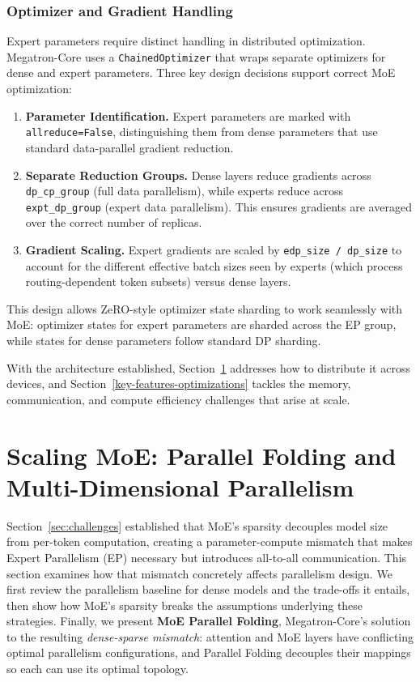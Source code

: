 \subsubsection{Optimizer and Gradient Handling}

Expert parameters require distinct handling in distributed optimization. Megatron-Core uses a \texttt{Chained\-Optimizer} that wraps separate optimizers for dense and expert parameters. Three key design decisions support correct MoE optimization:

\begin{enumerate}
    \item \textbf{Parameter Identification.} Expert parameters are marked with \texttt{allreduce=False}, distinguishing them from dense parameters that use standard data-parallel gradient reduction.

    \item \textbf{Separate Reduction Groups.} Dense layers reduce gradients across \texttt{dp\_cp\_group} (full data parallelism), while experts reduce across \texttt{expt\_dp\_group} (expert data parallelism). This ensures gradients are averaged over the correct number of replicas.

    \item \textbf{Gradient Scaling.} Expert gradients are scaled by \texttt{edp\_size / dp\_size} to account for the different effective batch sizes seen by experts (which process routing-dependent token subsets) versus dense layers.
\end{enumerate}

This design allows ZeRO-style optimizer state sharding \cite{rajbhandari2020zero} to work seamlessly with MoE: optimizer states for expert parameters are sharded across the EP group, while states for dense parameters follow standard DP sharding.

With the architecture established, Section~\ref{parallelism-strategies} addresses how to distribute it across devices, and Section~\ref{key-features-optimizations} tackles the memory, communication, and compute efficiency challenges that arise at scale.

\section{Scaling MoE: Parallel Folding and Multi-Dimensional Parallelism}\label{parallelism-strategies}

Section~\ref{sec:challenges} established that MoE's sparsity decouples model size from per-token computation, creating a parameter-compute mismatch that makes Expert Parallelism (EP) necessary but introduces all-to-all communication. This section examines how that mismatch concretely affects parallelism design. We first review the parallelism baseline for dense models and the trade-offs it entails, then show how MoE's sparsity breaks the assumptions underlying these strategies. Finally, we present \textbf{MoE Parallel Folding}, Megatron-Core's solution to the resulting \emph{dense-sparse mismatch}: attention and MoE layers have conflicting optimal parallelism configurations, and Parallel Folding decouples their mappings so each can use its optimal topology.

